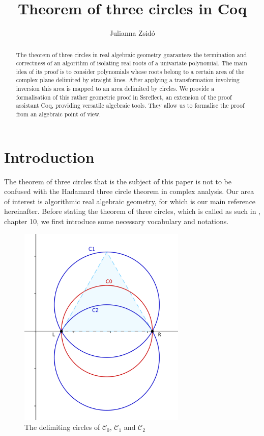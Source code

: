 \documentclass[11pt, a4paper]{article}
\title{Theorem of three circles in Coq}
\author{Julianna Zsid\'o}%
\date{}
\newcommand{\ssc}{{\mathcal C}}
\begin{document}
\maketitle

\begin{abstract}
The theorem of three circles in real algebraic geometry guarantees the termination and correctness of an algorithm of isolating real roots of a univariate polynomial. 
The main idea of its proof is to consider polynomials whose roots belong to a certain area of the complex plane delimited by straight lines. After applying a transformation involving inversion this area is mapped to an area delimited by circles. We provide a formalisation of this rather geometric proof in Ssreflect, an extension of the proof assistant Coq, providing versatile algebraic tools. They allow us to formalise the proof from an algebraic point of view.
\end{abstract}

\section{Introduction}

The theorem of three circles that is the subject of this paper is not to be confused with the Hadamard three circle theorem in complex analysis. Our area of interest is algorithmic real algebraic geometry, for which \cite{bpr} is our main reference hereinafter. Before stating the theorem of three circles, which is called as such in \cite{bpr}, chapter 10, we first introduce some necessary vocabulary and notations.

\begin{figure}[htb!]
\begin{centering}
\includegraphics[width=8cm]{3cercles_colors.png}
\caption{The delimiting circles of $\ssc_0$, $\ssc_1$ and $\ssc_2$}
\label{fig_3cercles}
\end{centering}
\end{figure}
\end{document}
